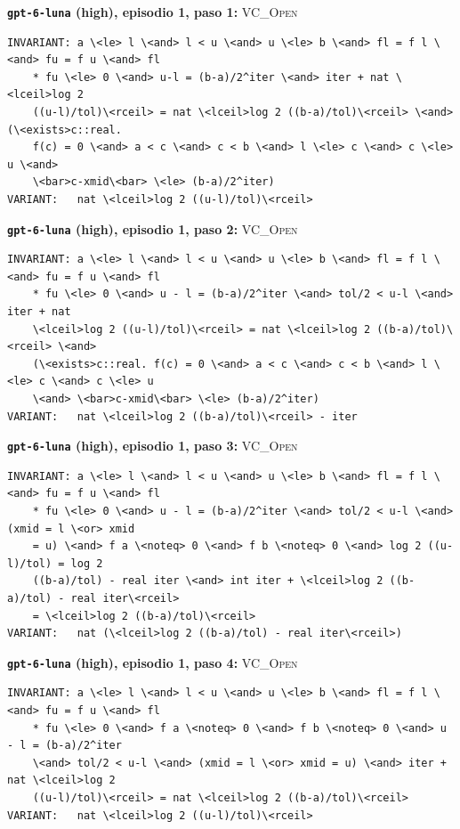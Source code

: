 \par\medskip\noindent\textbf{\texttt{gpt-6-luna} (high), episodio 1, paso 1:} \textsc{VC\_Open}\par\nopagebreak
\begin{lstlisting}
INVARIANT: a \<le> l \<and> l < u \<and> u \<le> b \<and> fl = f l \<and> fu = f u \<and> fl
    * fu \<le> 0 \<and> u-l = (b-a)/2^iter \<and> iter + nat \<lceil>log 2
    ((u-l)/tol)\<rceil> = nat \<lceil>log 2 ((b-a)/tol)\<rceil> \<and> (\<exists>c::real.
    f(c) = 0 \<and> a < c \<and> c < b \<and> l \<le> c \<and> c \<le> u \<and>
    \<bar>c-xmid\<bar> \<le> (b-a)/2^iter)
VARIANT:   nat \<lceil>log 2 ((u-l)/tol)\<rceil>
\end{lstlisting}
\par\medskip\noindent\textbf{\texttt{gpt-6-luna} (high), episodio 1, paso 2:} \textsc{VC\_Open}\par\nopagebreak
\begin{lstlisting}
INVARIANT: a \<le> l \<and> l < u \<and> u \<le> b \<and> fl = f l \<and> fu = f u \<and> fl
    * fu \<le> 0 \<and> u - l = (b-a)/2^iter \<and> tol/2 < u-l \<and> iter + nat
    \<lceil>log 2 ((u-l)/tol)\<rceil> = nat \<lceil>log 2 ((b-a)/tol)\<rceil> \<and>
    (\<exists>c::real. f(c) = 0 \<and> a < c \<and> c < b \<and> l \<le> c \<and> c \<le> u
    \<and> \<bar>c-xmid\<bar> \<le> (b-a)/2^iter)
VARIANT:   nat \<lceil>log 2 ((b-a)/tol)\<rceil> - iter
\end{lstlisting}
\par\medskip\noindent\textbf{\texttt{gpt-6-luna} (high), episodio 1, paso 3:} \textsc{VC\_Open}\par\nopagebreak
\begin{lstlisting}
INVARIANT: a \<le> l \<and> l < u \<and> u \<le> b \<and> fl = f l \<and> fu = f u \<and> fl
    * fu \<le> 0 \<and> u - l = (b-a)/2^iter \<and> tol/2 < u-l \<and> (xmid = l \<or> xmid
    = u) \<and> f a \<noteq> 0 \<and> f b \<noteq> 0 \<and> log 2 ((u-l)/tol) = log 2
    ((b-a)/tol) - real iter \<and> int iter + \<lceil>log 2 ((b-a)/tol) - real iter\<rceil>
    = \<lceil>log 2 ((b-a)/tol)\<rceil>
VARIANT:   nat (\<lceil>log 2 ((b-a)/tol) - real iter\<rceil>)
\end{lstlisting}
\par\medskip\noindent\textbf{\texttt{gpt-6-luna} (high), episodio 1, paso 4:} \textsc{VC\_Open}\par\nopagebreak
\begin{lstlisting}
INVARIANT: a \<le> l \<and> l < u \<and> u \<le> b \<and> fl = f l \<and> fu = f u \<and> fl
    * fu \<le> 0 \<and> f a \<noteq> 0 \<and> f b \<noteq> 0 \<and> u - l = (b-a)/2^iter
    \<and> tol/2 < u-l \<and> (xmid = l \<or> xmid = u) \<and> iter + nat \<lceil>log 2
    ((u-l)/tol)\<rceil> = nat \<lceil>log 2 ((b-a)/tol)\<rceil>
VARIANT:   nat \<lceil>log 2 ((u-l)/tol)\<rceil>
\end{lstlisting}
